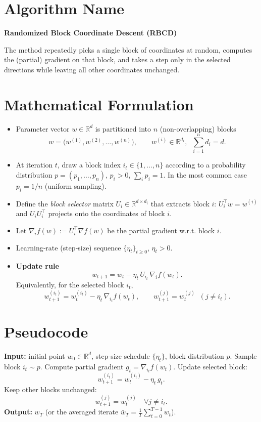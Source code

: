 \documentclass[11pt]{article}
\newcommand{\R}{\mathbb{R}}
\begin{document}
\section*{Algorithm Name}
\textbf{Randomized Block Coordinate Descent (RBCD)}  

The method repeatedly picks a single block of coordinates at random, computes the (partial) gradient on that block, and takes a step only in the selected directions while leaving all other coordinates unchanged.

\section*{Mathematical Formulation}
\begin{itemize}
    \item Parameter vector $w\in\R^{d}$ is partitioned into $n$ (non‑overlapping) blocks
          \[
          w = \bigl(w^{(1)},w^{(2)},\dots ,w^{(n)}\bigr),\qquad 
          w^{(i)}\in\R^{d_i},\;\; \sum_{i=1}^{n}d_i = d .
          \]
    \item At iteration $t$, draw a block index $i_t\in\{1,\dots ,n\}$ according to a probability
          distribution $p=(p_1,\dots ,p_n)$, $p_i>0$, $\sum_i p_i=1$.
          In the most common case $p_i=1/n$ (uniform sampling).
    \item Define the \emph{block selector} matrix $U_i\in\R^{d\times d_i}$ that extracts block $i$:
          $U_i^{\top}w = w^{(i)}$ and $U_iU_i^{\top}$ projects onto the coordinates of block $i$.
    \item Let $\nabla_i f(w) := U_i^{\top}\nabla f(w)$ be the partial gradient w.r.t. block $i$.
    \item Learning‑rate (step‑size) sequence $\{\eta_t\}_{t\ge 0}$, $\eta_t>0$.
    \item \textbf{Update rule}
          \[
          w_{t+1}= w_t - \eta_t\,U_{i_t}\,\nabla_i f(w_t) .
          \tag{1}
          \]
          Equivalently, for the selected block $i_t$,
          \[
          w_{t+1}^{(i_t)} = w_t^{(i_t)} - \eta_t \,\nabla_{i_t} f(w_t),\qquad 
          w_{t+1}^{(j)} = w_t^{(j)}\;\;(j\neq i_t).
          \]
\end{itemize}

\section*{Pseudocode}
\begin{algorithm}[H]
\caption{Randomized Block Coordinate Descent}
\begin{algorithmic}[1]
\STATE \textbf{Input:} initial point $w_0\in\R^{d}$, step‑size schedule $\{\eta_t\}$, block distribution $p$.
    \STATE Sample block $i_t\sim p$.
    \STATE Compute partial gradient $\displaystyle g_t = \nabla_{i_t} f(w_t)$.
    \STATE Update selected block:
    \[
    w_{t+1}^{(i_t)} = w_t^{(i_t)} - \eta_t\, g_t .
    \]
    \STATE Keep other blocks unchanged:
    \[
    w_{t+1}^{(j)} = w_t^{(j)}\quad \forall j\neq i_t .
    \]
\ENDFOR
\STATE \textbf{Output:} $w_T$ (or the averaged iterate $\bar w_T = \frac1T\sum_{t=0}^{T-1} w_t$).
\end{algorithmic}
\end{algorithm}
\end{document}
